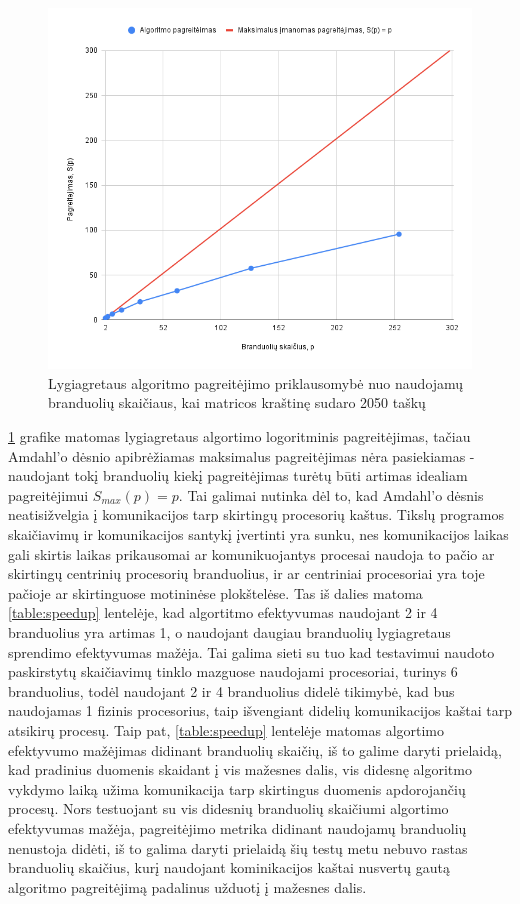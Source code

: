 \documentclass{VUMIFPSbakalaurinis}
\begin{document}
\begin{figure}[H]
    \centering
    \includegraphics[scale=0.5]{img/parallel_speedup.png}
    \caption{Lygiagretaus algoritmo pagreitėjimo priklausomybė nuo naudojamų branduolių skaičiaus, kai matricos kraštinę sudaro 2050 taškų}
    \label{img:parallel_speedup}
\end{figure}


\ref{img:parallel_speedup} grafike matomas lygiagretaus algortimo logoritminis pagreitėjimas, tačiau Amdahl'o dėsnio \cite{amdahl1967validity} apibrėžiamas maksimalus pagreitėjimas nėra pasiekiamas - naudojant tokį branduolių kiekį pagreitėjimas turėtų būti artimas idealiam pagreitėjimui  $S_{max}(p)=p$.
Tai galimai nutinka dėl to, kad Amdahl'o dėsnis neatisižvelgia į komunikacijos tarp skirtingų procesorių kaštus.
Tikslų programos skaičiavimų ir komunikacijos santykį įvertinti yra sunku, nes komunikacijos laikas gali skirtis laikas prikausomai ar komunikuojantys procesai naudoja to pačio ar skirtingų centrinių procesorių branduolius, 
ir ar centriniai procesoriai yra toje pačioje ar skirtinguose motininėse plokštelėse. 
Tas iš dalies matoma \ref{table:speedup} lentelėje, kad algortitmo efektyvumas naudojant 2 ir 4 branduolius yra artimas 1, o naudojant daugiau branduolių lygiagretaus sprendimo efektyvumas mažėja.
Tai galima sieti su tuo kad testavimui naudoto paskirstytų skaičiavimų tinklo mazguose naudojami procesoriai, turinys 6 branduolius, todėl naudojant 2 ir 4 branduolius didelė tikimybė, kad bus naudojamas 1 fizinis procesorius, taip išvengiant didelių komunikacijos kaštai tarp atsikirų procesų.
Taip pat, \ref{table:speedup} lentelėje matomas algortimo efektyvumo mažėjimas didinant branduolių skaičių, iš to galime daryti prielaidą, kad pradinius duomenis skaidant į vis mažesnes dalis, vis didesnę algoritmo vykdymo laiką užima komunikacija tarp skirtingus duomenis apdorojančių procesų.
Nors testuojant su vis didesnių branduolių skaičiumi algortimo efektyvumas mažėja, pagreitėjimo metrika didinant naudojamų branduolių nenustoja didėti, iš to galima daryti prielaidą šių testų metu nebuvo rastas branduolių skaičius, kurį naudojant kominikacijos kaštai nusvertų gautą algoritmo pagreitėjimą padalinus užduotį į mažesnes dalis. 
\end{document}
